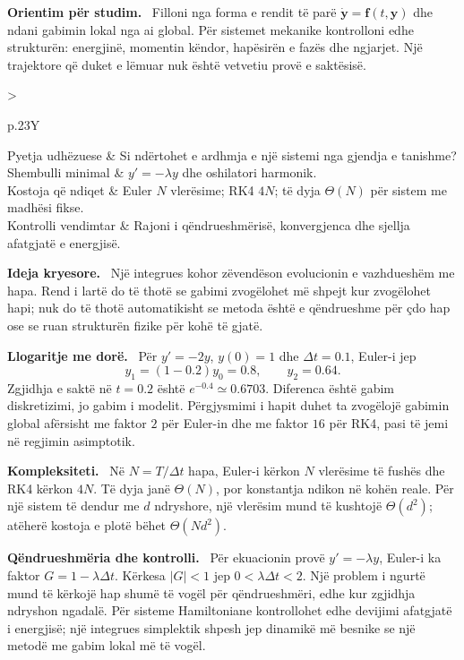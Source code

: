 \documentclass[11pt,oneside,openany]{book}
\newcommand{\vect}[1]{\bm{#1}}
\newenvironment{orientim}{\par\medskip\noindent\textbf{Orientim për studim.}\ }{\par\medskip}
\newenvironment{ideja}{\par\medskip\noindent\textbf{Ideja kryesore.}\ }{\par\medskip}
\newenvironment{llogaritjedore}{\par\medskip\noindent\textbf{Llogaritje me dorë.}\ }{\par\medskip}
\newenvironment{kompleksitet}{\par\medskip\noindent\textbf{Kompleksiteti.}\ }{\par\medskip}
\newenvironment{qendrueshmeri}{\par\medskip\noindent\textbf{Qëndrueshmëria dhe kontrolli.}\ }{\par\medskip}
\newcommand{\hartakapitullit}[4]{%
\par\smallskip
\noindent\begin{tabularx}{\textwidth}{>{\bfseries\raggedright\arraybackslash}p{.23\textwidth}Y}
Pyetja udhëzuese & #1\\
Shembulli minimal & #2\\
Kostoja që ndiqet & #3\\
Kontrolli vendimtar & #4
\end{tabularx}\par\medskip}
\begin{document}
\begin{orientim}
Filloni nga forma e rendit të parë $\dot{\vect y}=\vect f(t,\vect y)$ dhe
ndani gabimin lokal nga ai global. Për sistemet mekanike kontrolloni edhe
strukturën: energjinë, momentin këndor, hapësirën e fazës dhe ngjarjet. Një
trajektore që duket e lëmuar nuk është vetvetiu provë e saktësisë.
\end{orientim}

\hartakapitullit
{Si ndërtohet e ardhmja e një sistemi nga gjendja e tanishme?}
{$y'=-\lambda y$ dhe oshilatori harmonik.}
{Euler $N$ vlerësime; RK4 $4N$; të dyja $\Theta(N)$ për sistem me madhësi fikse.}
{Rajoni i qëndrueshmërisë, konvergjenca dhe sjellja afatgjatë e energjisë.}

\begin{ideja}
Një integrues kohor zëvendëson evolucionin e vazhdueshëm me hapa. Rend i
lartë do të thotë se gabimi zvogëlohet më shpejt kur zvogëlohet hapi; nuk do
të thotë automatikisht se metoda është e qëndrueshme për çdo hap ose se ruan
strukturën fizike për kohë të gjatë.
\end{ideja}

\begin{llogaritjedore}
Për $y'=-2y$, $y(0)=1$ dhe $\Delta t=0.1$, Euler-i jep
\begin{equation}
 y_1=(1-0.2)y_0=0.8,\qquad y_2=0.64.
\end{equation}
Zgjidhja e saktë në $t=0.2$ është $e^{-0.4}\simeq0.6703$. Diferenca është
gabim diskretizimi, jo gabim i modelit. Përgjysmimi i hapit duhet ta zvogëlojë
gabimin global afërsisht me faktor $2$ për Euler-in dhe me faktor $16$ për
RK4, pasi të jemi në regjimin asimptotik.
\end{llogaritjedore}

\begin{kompleksitet}
Në $N=T/\Delta t$ hapa, Euler-i kërkon $N$ vlerësime të fushës dhe RK4
kërkon $4N$. Të dyja janë $\Theta(N)$, por konstantja ndikon në kohën reale.
Për një sistem të dendur me $d$ ndryshore, një vlerësim mund të kushtojë
$\Theta(d^2)$; atëherë kostoja e plotë bëhet $\Theta(Nd^2)$.
\end{kompleksitet}

\begin{qendrueshmeri}
Për ekuacionin provë $y'=-\lambda y$, Euler-i ka faktor
$G=1-\lambda\Delta t$. Kërkesa $|G|<1$ jep
$0<\lambda\Delta t<2$. Një problem i ngurtë mund të kërkojë hap shumë të
vogël për qëndrueshmëri, edhe kur zgjidhja ndryshon ngadalë. Për sisteme
Hamiltoniane kontrollohet edhe devijimi afatgjatë i energjisë; një integrues
simplektik shpesh jep dinamikë më besnike se një metodë me gabim lokal më të
vogël.
\end{qendrueshmeri}
\end{document}
